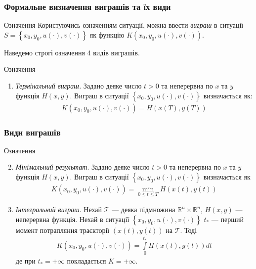 \documentclass[10pt,pdf]{beamer}
\newcommand{\R}{\mathbb{R}}
\newcommand{\T}{\mathcal{T}}
\renewcommand{\l}{\left}
\renewcommand{\r}{\right}
\newcommand{\intl}{\int\limits}
\begin{document}
    \begin{frame}
        \frametitle{Формальне визначення виграшів та їх види}

        \begin{block}{Означення}
            Користуючись означенням ситуації, можна ввести \emph{виграш} в ситуації $S = \l\{x_0, y_0, u(\cdot), v(\cdot) \r\}$
            як функцію $K(x_0, y_0, u(\cdot), v(\cdot))$.
        \end{block}

        Наведемо строгі означення 4 видів виграшів.

        \begin{block}{Означення}
            \begin{enumerate}
                \item \emph{Термінальний виграш.} Задано деяке число $t>0$ та неперервна по $x$ та $y$ функція $H(x, y)$. Виграш в ситуації $\l\{x_0, y_0, u(\cdot), v(\cdot) \r\}$
                визначається як:
                \begin{gather*}
                    K(x_0, y_0, u(\cdot), v(\cdot)) = H(x(T), y(T))
                \end{gather*}
            \end{enumerate}
        \end{block}
    \end{frame}
    \begin{frame}
        \frametitle{Види виграшів}
        
        \begin{block}{Означення}
            \begin{enumerate}
                \setcounter{enumi}{1}
                \item \emph{Мінімальний результат}. Задано деяке число $t>0$ та неперервна по $x$ та $y$ функція $H(x, y)$. Виграш в ситуації $\l\{x_0, y_0, u(\cdot), v(\cdot) \r\}$
                визначається як
                \begin{gather*}
                    K(x_0, y_0, u(\cdot), v(\cdot)) = \underset{0 \leq t \leq T}{\min} H(x(t), y(t))
                \end{gather*}

                \item  \emph{Інтегральний виграш}. Нехай $\T$ --- деяка підмножина $\R^n \times \R^n$, $H(x, y)$ --- неперервна функція. Нехай в ситуації $\l\{x_0, y_0, u(\cdot), v(\cdot) \r\}$
                $t_*$ --- перший момент потрапляння траєкторії $(x(t), y(t))$ на $\T$.
                Тоді
                \begin{gather*}
                    K(x_0, y_0, u(\cdot), v(\cdot)) = \intl_0^{t_*} H(x(t), y(t)) dt
                \end{gather*}
                де при $t_* = +\infty$ покладається $K = +\infty$.

            \end{enumerate}
        \end{block}
    
    \end{frame}
\end{document}
